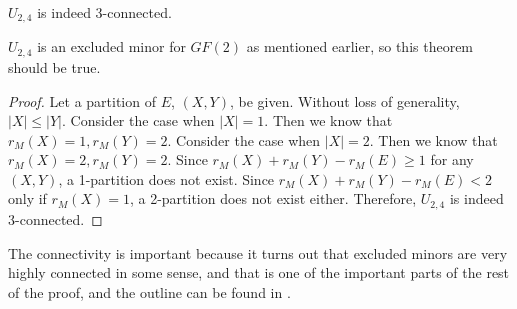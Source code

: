 \begin{thm}
$U_{2, 4}$ is indeed 3-connected.
\end{thm}
$U_{2, 4}$ is an excluded minor for $GF(2)$ as mentioned earlier, so this theorem should be true.
\begin{proof}
Let a partition of $E$, $(X, Y)$, be given.
Without loss of generality, $\lvert X \rvert \leq \lvert Y \rvert$.
Consider the case when $\lvert X \rvert = 1$.
Then we know that $r_M(X) = 1, r_M(Y) = 2$.
Consider the case when $\lvert X \rvert = 2$.
Then we know that $r_M(X) = 2, r_M(Y) = 2$.
Since $r_M(X) + r_M(Y) - r_M(E) \geq 1$ for any $(X, Y)$, a 1-partition does not exist.
Since $r_M(X) + r_M(Y) - r_M(E) < 2$ only if $r_M(X) = 1$, a 2-partition does not exist either.
Therefore, $U_{2, 4}$ is indeed 3-connected.
\end{proof}

The connectivity is important because it turns out that excluded minors are very highly connected in some sense, and that is one of the important parts of the rest of the proof, and the outline can be found in \cite{solving}.

% 
% 
% 
